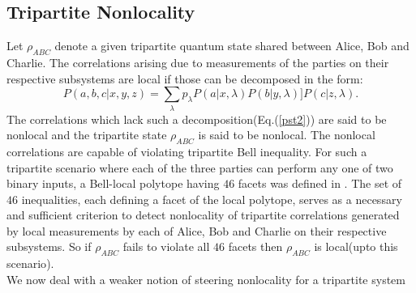 \documentclass[pra,10pt,twocolumn,superscriptaddress,floatfix,showpacs]{revtex4-1}
\begin{document}
\subsection{Tripartite Nonlocality}
Let $\rho_{ABC}$ denote a given tripartite quantum state shared between Alice, Bob and Charlie. The correlations arising due to measurements of the parties on their respective subsystems are local if those can be decomposed in the form:
\begin{equation}\label{pst2}
P(a,b,c|x,y,z)=\sum_{\lambda}p_{\lambda}P(a|x, \lambda)P(b|y,\lambda)]P(c|z,\lambda).
\end{equation}
The correlations which lack such a decomposition(Eq.(\ref{pst2})) are said to be nonlocal and the tripartite state $\rho_{ABC}$ is said to be nonlocal. The nonlocal correlations are capable of  violating  tripartite Bell inequality.
For such a tripartite scenario where each of the three parties can perform any one of two binary inputs,  a Bell-local polytope having $46$ facets was defined in \cite{Sliwa}. The set of $46$ inequalities, each defining a facet of the local polytope, serves as a necessary and sufficient criterion to detect nonlocality of tripartite correlations generated by local measurements by each of Alice, Bob and Charlie on their respective subsystems. So if $\rho_{ABC}$ fails to violate all $46$ facets then $\rho_{ABC}$ is local(upto this scenario\cite{Sliwa}).\\
We now deal with a weaker notion of steering nonlocality for a tripartite system\cite{caval1}
\end{document}
